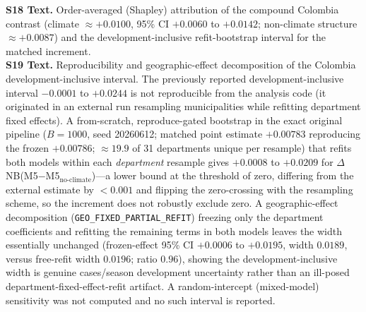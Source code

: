 \documentclass[11pt,a4paper]{article}
\begin{document}
\textbf{S18 Text.} Order-averaged (Shapley) attribution of the compound Colombia contrast (climate $\approx+0.0100$, 95\% CI $+0.0060$ to $+0.0142$; non-climate structure $\approx+0.0087$) and the development-inclusive refit-bootstrap interval for the matched increment.\\
\textbf{S19 Text.} Reproducibility and geographic-effect decomposition of the Colombia development-inclusive interval. The previously reported development-inclusive interval $-0.0001$ to $+0.0244$ is not reproducible from the analysis code (it originated in an external run resampling municipalities while refitting department fixed effects). A from-scratch, reproduce-gated bootstrap in the exact original pipeline ($B=1000$, seed 20260612; matched point estimate $+0.00783$ reproducing the frozen $+0.00786$; ${\approx}19.9$ of 31 departments unique per resample) that refits both models within each \emph{department} resample gives $+0.0008$ to $+0.0209$ for $\Delta$NB(M5$-$M5$_{\text{no-climate}}$)---a lower bound at the threshold of zero, differing from the external estimate by $<0.001$ and flipping the zero-crossing with the resampling scheme, so the increment does not robustly exclude zero. A geographic-effect decomposition (\texttt{GEO\_FIXED\_PARTIAL\_REFIT}) freezing only the department coefficients and refitting the remaining terms in both models leaves the width essentially unchanged (frozen-effect 95\% CI $+0.0006$ to $+0.0195$, width $0.0189$, versus free-refit width $0.0196$; ratio $0.96$), showing the development-inclusive width is genuine cases/season development uncertainty rather than an ill-posed department-fixed-effect-refit artifact. A random-intercept (mixed-model) sensitivity was not computed and no such interval is reported.
\endgroup
\end{document}
